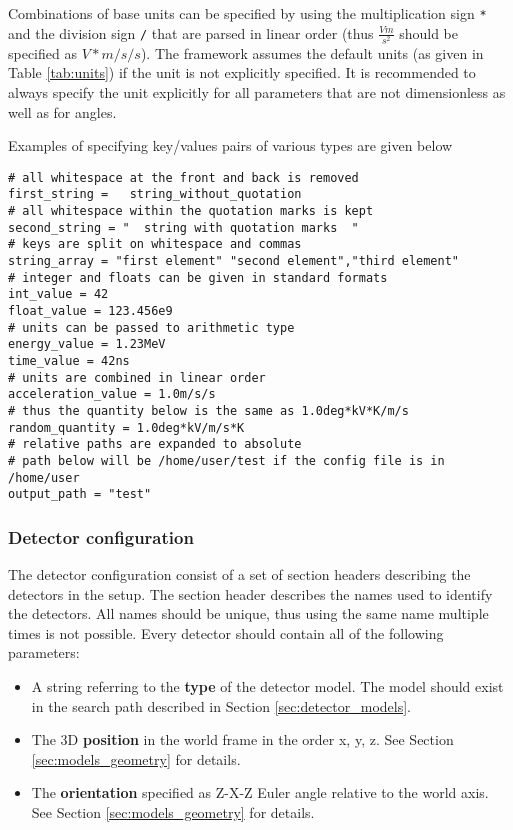 Combinations of base units can be specified by using the multiplication sign \texttt{*} and the division sign \texttt{/} that are parsed in linear order (thus $\frac{V m}{s^2}$ should be specified as $V*m/s/s$). The framework assumes the default units (as given in Table \ref{tab:units}) if the unit is not explicitly specified. It is recommended to always specify the unit explicitly for all parameters that are not dimensionless as well as for angles.

Examples of specifying key/values pairs of various types are given below
\begin{verbatim}
# all whitespace at the front and back is removed
first_string =   string_without_quotation  
# all whitespace within the quotation marks is kept
second_string = "  string with quotation marks  "
# keys are split on whitespace and commas
string_array = "first element" "second element","third element"
# integer and floats can be given in standard formats
int_value = 42
float_value = 123.456e9
# units can be passed to arithmetic type
energy_value = 1.23MeV
time_value = 42ns
# units are combined in linear order
acceleration_value = 1.0m/s/s
# thus the quantity below is the same as 1.0deg*kV*K/m/s
random_quantity = 1.0deg*kV/m/s*K 
# relative paths are expanded to absolute 
# path below will be /home/user/test if the config file is in /home/user
output_path = "test" 
\end{verbatim}

\subsubsection{Detector configuration}
\label{sec:detector_config}
The detector configuration consist of a set of section headers describing the detectors in the setup. The section header describes the names used to identify the detectors. All names should be unique, thus using the same name multiple times is not possible. Every detector should contain all of the following parameters:
\begin{itemize}
\item A string referring to the \textbf{type} of the detector model. The model should exist in the search path described in Section \ref{sec:detector_models}.
\item The 3D \textbf{position} in the world frame in the order x, y, z. See Section \ref{sec:models_geometry} for details.
\item The \textbf{orientation} specified as Z-X-Z Euler angle relative to the world axis. See Section \ref{sec:models_geometry} for details.
\end{itemize}

